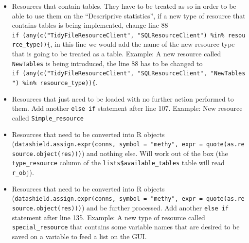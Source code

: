 \documentclass[
]{book}
\newenvironment{Shaded}{\begin{snugshade}}{\end{snugshade}}
\newcommand{\CommentTok}[1]{\textcolor[rgb]{0.56,0.35,0.01}{\textit{#1}}}
\newcommand{\ControlFlowTok}[1]{\textcolor[rgb]{0.13,0.29,0.53}{\textbf{#1}}}
\newcommand{\ErrorTok}[1]{\textcolor[rgb]{0.64,0.00,0.00}{\textbf{#1}}}
\newcommand{\KeywordTok}[1]{\textcolor[rgb]{0.13,0.29,0.53}{\textbf{#1}}}
\newcommand{\NormalTok}[1]{#1}
\newcommand{\OperatorTok}[1]{\textcolor[rgb]{0.81,0.36,0.00}{\textbf{#1}}}
\newcommand{\StringTok}[1]{\textcolor[rgb]{0.31,0.60,0.02}{#1}}
\providecommand{\tightlist}{%
  \setlength{\itemsep}{0pt}\setlength{\parskip}{0pt}}
\begin{document}
\begin{itemize}
\tightlist
\item
  Resources that contain tables. They have to be treated as so in order to be able to use them on the ``Descriprive statistics'', if a new type of resource that contains tables is being implemented, change line 88 \texttt{if\ (any(c("TidyFileResourceClient",\ "SQLResourceClient")\ \%in\%\ resource\_type))\{}, in this line we would add the name of the new resource type that is going to be treated as a table. Example: A new resource called \texttt{NewTables} is being introduced, the line 88 has to be changed to \texttt{if\ (any(c("TidyFileResourceClient",\ "SQLResourceClient",\ "NewTables")\ \%in\%\ resource\_type))\{}.
\item
  Resources that just need to be loaded with no further action performed to them. Add another \texttt{else\ if} statement after line 107. Example: New resource called \texttt{Simple\_resource}
\end{itemize}

\begin{Shaded}
\end{Shaded}

\begin{itemize}
\tightlist
\item
  Resources that need to be converted into R objects (\texttt{datashield.assign.expr(conns,\ symbol\ =\ "methy",\ expr\ =\ quote(as.resource.object(res)))}) and nothing else. Will work out of the box (the \texttt{type\_resource} column of the \texttt{lists\$available\_tables} table will read \texttt{r\_obj}).
\item
  Resources that need to be converted into R objects (\texttt{datashield.assign.expr(conns,\ symbol\ =\ "methy",\ expr\ =\ quote(as.resource.object(res)))}) and be further processed. Add another \texttt{else\ if} statement after line 135. Example: A new type of resource called \texttt{special\_resource} that contains some variable names that are desired to be saved on a variable to feed a list on the GUI.
\end{itemize}
\end{document}

